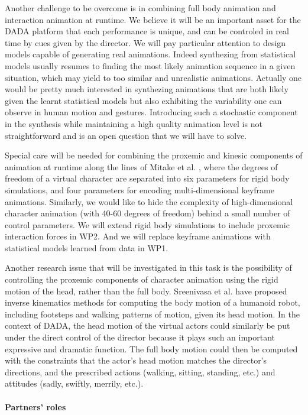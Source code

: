 Another challenge to be overcome is in combining full body animation and interaction animation at runtime. We believe it will be an important asset for the DADA platform that each performance is unique, and can be controled in real time by cues given by the director.  We will pay particular attention to design models capable of generating real animations. Indeed synthezing from statistical models usually resumes to finding the most likely animation sequence in a given situation, which may yield to too similar and unrealistic animations.  Actually one would be pretty much interested in synthezing animations that are both likely given the learnt statistical models but also exhibiting the variability one can observe in human motion and gestures. Introducing such a stochastic component in the synthesis while maintaining a high quality animation level is not  straightforward and is an open question that we will have to solve.

Special care will be needed for combining the proxemic and kinesic components of animation at runtime along the lines of Mitake et al. \cite{Mitake09}, 
where the degrees of freedom of a virtual character are separated into six parameters for rigid body simulations,  and four parameters for encoding multi-dimensional keyframe animations. Similarly, we would like to hide the complexity of high-dimensional  character animation (with 40-60 degrees of freedom) behind a small number of control parameters. We will extend rigid body simulations  to include proxemic interaction forces in WP2. And we will replace keyframe animations with statistical models learned from data in WP1. 

Another research issue that will be investigated in this task  is the possibility  of  controlling the proxemic components of character animation using the rigid motion of the head, rather than the full body.  Sreenivasa et al. \cite{Sreenivasa09} have proposed inverse kinematics methods for computing  the body motion of a humanoid robot, including footsteps and walking patterns of motion, given its head motion. In the context of DADA, the head motion of the virtual actors could similarly be put under the direct control of the director because it plays such an important expressive and dramatic function. The full body motion could then be computed with the constraints that the actor's head motion matches the director's directions, and the prescribed actions (walking, sitting, standing, etc.) and attitudes (sadly, swiftly, merrily, etc.).

\paragraph{Partners' roles}

